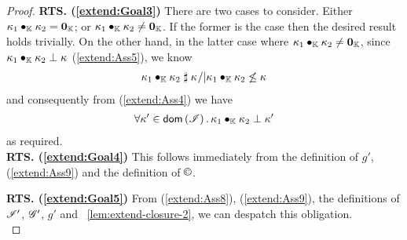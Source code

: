 \begin{lemma}
\begin{proof}
\noindent\textbf{RTS. (\ref{extend:Goal3})}
There are two cases to consider. Either $\kappa_{1} \bullet_{\mathbb{K}} \kappa_{2} = \mathbf{0}_{\mathbb{K}}$;  or $\kappa_{1} \bullet_{\mathbb{K}} \kappa_{2} \not= \mathbf{0}_{\mathbb{K}}$. If the former is the case then the desired result holds trivially. On the other hand, in the latter case where $\kappa_{1} \bullet_{\mathbb{K}} \kappa_{2} \not= \mathbf{0}_{\mathbb{K}}$, since $\kappa_{1} \bullet_{\mathbb{K}} \kappa_{2} \mathrel{\bot} \kappa_{}$ (\ref{extend:Ass5}), we know 
%
\begin{align*}
	\kappa_{1} \bullet_{\mathbb{K}} \kappa_{2} \mathrel{\sharp} \kappa_{} /| \kappa_{1} \bullet_{\mathbb{K}} \kappa_{2} \not\leq \kappa_{} 
\end{align*}
% 
and consequently from (\ref{extend:Ass4}) we have
%
\begin{align*}
	\forall \kappa_{}' \in \textsf{dom}\left( \mathscr{I} \right).\, \kappa_{1} \bullet_{\mathbb{K}} \kappa_{2} \mathrel{\bot} \kappa_{}'
\end{align*}
%
as required. \\

\noindent\textbf{RTS. (\ref{extend:Goal4})}
This follows immediately from the definition of $g'$, (\ref{extend:Ass9}) and the definition of $\containI$.

\noindent\textbf{RTS. (\ref{extend:Goal5})}
From (\ref{extend:Ass8}), (\ref{extend:Ass9}), the definitions of $\mathscr{I}'$, $\mathscr{G}'$, $g'$ and \lem~\ref{lem:extend-closure-2}, we can despatch this obligation.\\


\end{proof}
\end{lemma}
